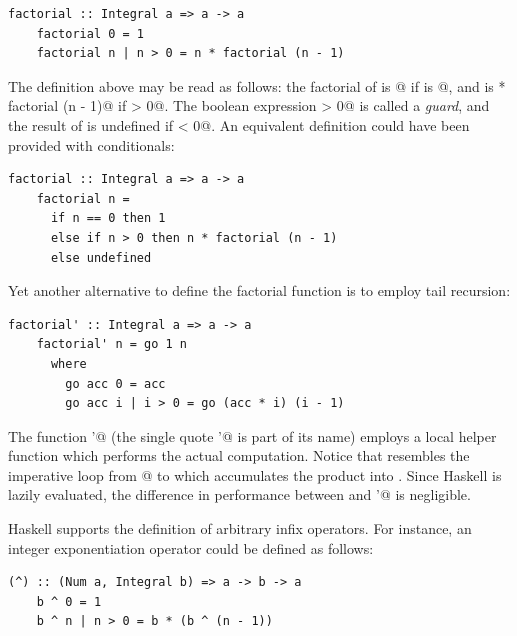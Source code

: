 \documentclass[UdineBachThesis,american,11pt]{PhdThesis}
\begin{document}
  \begin{lstlisting}[gobble=4,basicstyle=\ttfamily\small]
    factorial :: Integral a => a -> a
    factorial 0 = 1
    factorial n | n > 0 = n * factorial (n - 1)
  \end{lstlisting}

  The definition above may be read as follows: the factorial of \lstinline@n@ is
  @ if \lstinline@n@ is @, and is
  \lstinline@n * factorial (n - 1)@ if \lstinline@n > 0@. The boolean expression
  \lstinline@n > 0@ is called a \emph{guard}, and the result of
  \lstinline@factorial@ is undefined if \lstinline@n < 0@. An equivalent
  definition could have been provided with conditionals:

  \begin{lstlisting}[gobble=4,basicstyle=\ttfamily\small]
    factorial :: Integral a => a -> a
    factorial n =
      if n == 0 then 1
      else if n > 0 then n * factorial (n - 1)
      else undefined
  \end{lstlisting}

  Yet another alternative to define the factorial function is to employ tail
  recursion:

  \pagebreak

  \begin{lstlisting}[gobble=4,basicstyle=\ttfamily\small]
    factorial' :: Integral a => a -> a
    factorial' n = go 1 n
      where
        go acc 0 = acc
        go acc i | i > 0 = go (acc * i) (i - 1)
  \end{lstlisting}

  The function \lstinline@factorial'@ (the single quote \lstinline@'@ is part of
  its name) employs a local helper function \lstinline@go@ which performs the
  actual computation. Notice that \lstinline@go@ resembles the imperative loop
  from @ to \lstinline@n@ which accumulates the product into
  \lstinline@acc@. Since Haskell is lazily evaluated, the difference in
  performance between \lstinline@factorial@ and \lstinline@factorial'@ is
  negligible.

  Haskell supports the definition of arbitrary infix operators. For instance,
  an integer exponentiation operator could be defined as follows:

  \begin{lstlisting}[gobble=4,basicstyle=\ttfamily\small]
    (^) :: (Num a, Integral b) => a -> b -> a
    b ^ 0 = 1
    b ^ n | n > 0 = b * (b ^ (n - 1))
  \end{lstlisting}
\end{document}
